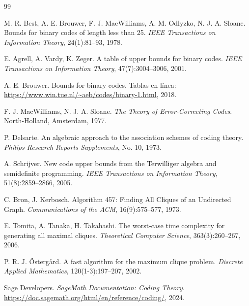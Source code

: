 \documentclass[12pt, spanish]{article}
\begin{document}
\begin{thebibliography}{99}

M. R. Best, A. E. Brouwer, F. J. MacWilliams, A. M. Odlyzko, N. J. A. Sloane.
\newblock Bounds for binary codes of length less than 25.
\newblock \textit{IEEE Transactions on Information Theory}, 24(1):81–93, 1978.

E. Agrell, A. Vardy, K. Zeger.
\newblock A table of upper bounds for binary codes.
\newblock \textit{IEEE Transactions on Information Theory}, 47(7):3004–3006, 2001.

A. E. Brouwer.
\newblock Bounds for binary codes.
\newblock Tablas en línea: \url{https://www.win.tue.nl/~aeb/codes/binary-1.html}, 2018.

F. J. MacWilliams, N. J. A. Sloane.
\newblock \textit{The Theory of Error-Correcting Codes}.
\newblock North-Holland, Amsterdam, 1977.

P. Delsarte.
\newblock An algebraic approach to the association schemes of coding theory.
\newblock \textit{Philips Research Reports Supplements}, No. 10, 1973.

A. Schrijver.
\newblock New code upper bounds from the Terwilliger algebra and semidefinite programming.
\newblock \textit{IEEE Transactions on Information Theory}, 51(8):2859–2866, 2005.

C. Bron, J. Kerbosch.
\newblock Algorithm 457: Finding All Cliques of an Undirected Graph.
\newblock \textit{Communications of the ACM}, 16(9):575–577, 1973.

E. Tomita, A. Tanaka, H. Takahashi.
\newblock The worst-case time complexity for generating all maximal cliques.
\newblock \textit{Theoretical Computer Science}, 363(3):260–267, 2006.

P. R. J. Östergård.
\newblock A fast algorithm for the maximum clique problem.
\newblock \textit{Discrete Applied Mathematics}, 120(1-3):197–207, 2002.

Sage Developers.
\newblock \textit{SageMath Documentation: Coding Theory}.
\newblock \url{https://doc.sagemath.org/html/en/reference/coding/}, 2024.

\end{thebibliography}
\end{document}
